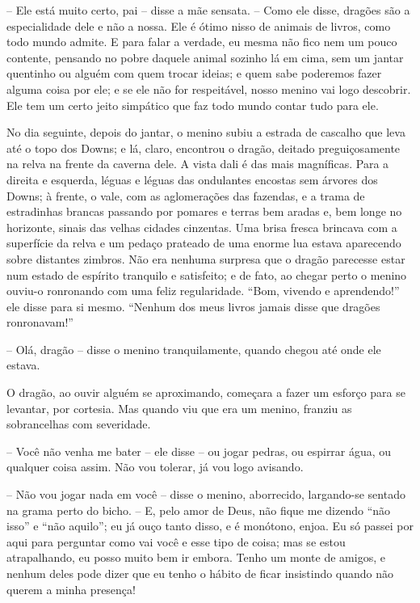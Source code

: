 -- Ele está muito certo, pai -- disse a mãe sensata. -- Como ele disse,
dragões são a especialidade dele e não a nossa. Ele é ótimo nisso de
animais de livros, como todo mundo admite. E para falar a verdade, eu
mesma não fico nem um pouco contente, pensando no pobre daquele
animal sozinho lá em cima, sem um jantar quentinho ou alguém com quem
trocar ideias; e quem sabe poderemos fazer alguma coisa por ele; e se
ele não for respeitável, nosso menino vai logo descobrir. Ele tem um
certo jeito simpático que faz todo mundo contar tudo para ele.

No dia seguinte, depois do jantar, o menino subiu a estrada de
cascalho que leva até o topo dos Downs; e lá, claro, encontrou o
dragão, deitado preguiçosamente na relva na frente da caverna dele. A
vista dali é das mais magníficas. Para a direita e esquerda, léguas e
léguas das ondulantes encostas sem árvores dos Downs; à frente, o
vale, com as aglomerações das fazendas, e a trama de estradinhas
brancas passando por pomares e terras bem aradas e, bem longe no
horizonte, sinais das velhas cidades cinzentas. Uma brisa fresca
brincava com a superfície da relva e um pedaço prateado de uma enorme
lua estava aparecendo sobre distantes zimbros. Não era nenhuma
surpresa que o dragão parecesse estar num estado de espírito
tranquilo e satisfeito; e de fato, ao chegar perto o menino ouviu-o
ronronando com uma feliz regularidade. “Bom, vivendo e aprendendo!”
ele disse para si mesmo. “Nenhum dos meus livros jamais disse que
dragões ronronavam!” 

-- Olá, dragão -- disse o menino tranquilamente, quando chegou até onde
ele estava.

O dragão, ao ouvir alguém se aproximando, começara a fazer um esforço
para se levantar, por cortesia. Mas quando viu que era um menino,
franziu as sobrancelhas com severidade.

-- Você não venha me bater -- ele disse -- ou jogar pedras, ou espirrar
água, ou qualquer coisa assim. Não vou tolerar, já vou logo avisando.

-- Não vou jogar nada em você -- disse o menino, aborrecido, largando-se
sentado na grama perto do bicho. -- E, pelo amor de Deus, não fique me
dizendo “não isso” e “não aquilo”; eu já ouço tanto disso, e é
monótono, enjoa. Eu só passei por aqui para perguntar como vai você e
esse tipo de coisa; mas se estou atrapalhando, eu posso muito bem ir
embora. Tenho um monte de amigos, e nenhum deles pode dizer que eu
tenho o hábito de ficar insistindo quando não querem a minha
presença!


